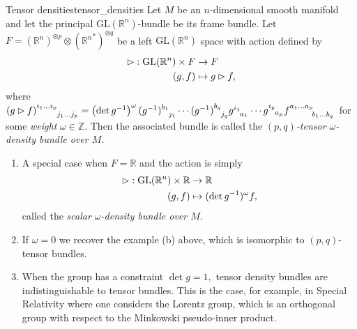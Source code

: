 \begin{definition}{Tensor densities}{tensor_densities}
    Let \(M\) be an \(n\)-dimensional smooth manifold and let the principal \(\mathrm{GL}(\mathbb{R}^n)\)-bundle  be its frame bundle. Let \(F = \left(\mathbb{R}^n\right)^{\otimes p} \otimes \left({\mathbb{R}^n}^{\ast}\right)^{\otimes q}\) be a left \(\mathrm{GL}(\mathbb{R}^n)\) space with action defined by
    \begin{align*}
        \mathbin{\vartriangleright} : \mathrm{GL}(\mathbb{R}^n) \times F &\to F\\
                                             (g,f) &\mapsto g \mathbin{\vartriangleright} f,
    \end{align*}
    where \((g \lact f)\indices{^{i_1\dots i_p}_{j_1\dots j_p}} = \left(\det{g^{-1}}\right)^\omega(g^{-1})\indices{^{b_1}_{j_1}}\dotsm (g^{-1})\indices{^{b_q}_{j_q}} g\indices{^{i_1}_{a_1}} \dotsm g\indices{^{i_p}_{a_p}}f\indices{^{a_1\dots a_p}_{b_1\dots b_q}}\) for some \emph{weight} \(\omega \in \mathbb{Z}.\) Then the associated bundle  is called the \emph{\((p,q)\)-tensor \(\omega\)-density bundle over \(M\).}
\end{definition}
\begin{remark}
    \begin{enumerate}[label=(\alph*)]
        \item A special case when \(F = \mathbb{R}\) and the action is simply
            \begin{align*}
                \mathbin{\vartriangleright} : \mathrm{GL}(\mathbb{R}^n) \times \mathbb{R} &\to \mathbb{R}\\
                                                              (g,f) &\mapsto (\det g^{-1})^\omega f,
            \end{align*}
            called the \emph{scalar \(\omega\)-density bundle over \(M\)}.
        \item If \(\omega = 0\) we recover the example (b) above, which is isomorphic to \((p,q)\)-tensor bundles.
        \item When the group has a constraint \(\det g = 1,\) tensor density bundles are indistinguishable to tensor bundles. This is the case, for example, in Special Relativity where one considers the Lorentz group, which is an orthogonal group with respect to the Minkowski pseudo-inner product.
    \end{enumerate}
\end{remark}

